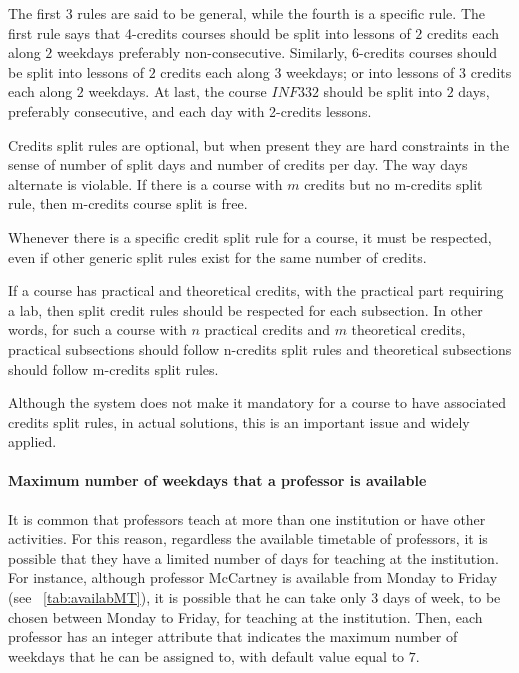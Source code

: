 The first $3$ rules are said to be general, while the fourth is a specific rule. The first rule says that 4-credits courses should be split into lessons of $2$ credits each along $2$ weekdays preferably non-consecutive. Similarly, 6-credits courses should be split into lessons of $2$ credits each along $3$ weekdays; or into lessons of $3$ credits each along $2$ weekdays. At last, the course $INF332$ should be split into $2$ days, preferably consecutive, and each day with 2-credits lessons.

Credits split rules are optional, but when present they are hard constraints in the sense of number of split days and number of credits per day. The way days alternate is violable. If there is a course with $m$ credits but no m-credits split rule, then m-credits course split is free.

Whenever there is a specific credit split rule for a course, it must be respected, even if other generic split rules exist for the same number of credits.

If a course has practical and theoretical credits, with the practical part requiring a lab, then split credit rules should be respected for each subsection. In other words, for such a course with $n$ practical credits and $m$ theoretical credits, practical subsections should follow n-credits split rules and theoretical subsections should follow m-credits split rules.

Although the system does not make it mandatory for a course to have associated credits split rules, in actual solutions, this is an important issue and widely applied.


\paragraph{Maximum number of weekdays that a professor is available}
\label{constrmaxdaysprof}

It is common that professors teach at more than one institution or have other activities. For this reason, regardless the available timetable of professors, it is possible that they have a limited number of days for teaching at the institution. For instance, although professor McCartney is available from Monday to Friday (see ~\ref{tab:availabMT}), it is possible that he can take only $3$ days of week, to be chosen between Monday to Friday, for teaching at the institution. Then, each professor has an integer attribute that indicates the maximum number of weekdays that he can be assigned to, with default value equal to $7$.


